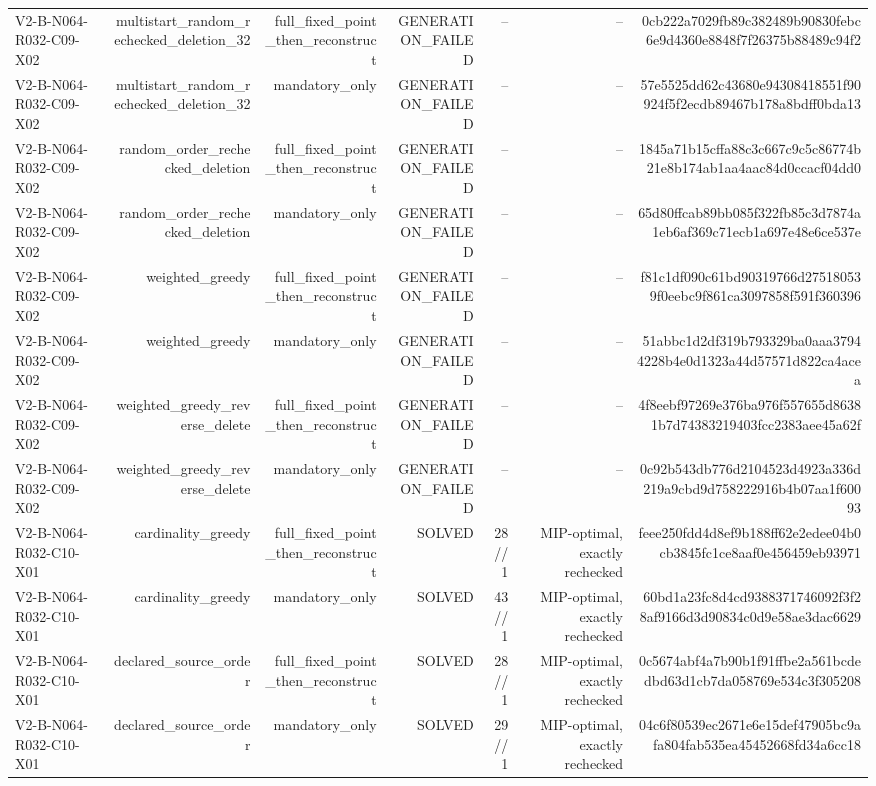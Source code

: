 {\begin{longtable}{lrrrrrr}
V2-B-N064-R032-C09-X02 & multistart\_random\_rechecked\_deletion\_32 & full\_fixed\_point\_then\_reconstruct & GENERATION\_FAILED & -- & -- & 0cb222a7029fb89c382489b90830febc6e9d4360e8848f7f26375b88489c94f2 \\
V2-B-N064-R032-C09-X02 & multistart\_random\_rechecked\_deletion\_32 & mandatory\_only & GENERATION\_FAILED & -- & -- & 57e5525dd62c43680e94308418551f90924f5f2ecdb89467b178a8bdff0bda13 \\
V2-B-N064-R032-C09-X02 & random\_order\_rechecked\_deletion & full\_fixed\_point\_then\_reconstruct & GENERATION\_FAILED & -- & -- & 1845a71b15cffa88c3c667c9c5c86774b21e8b174ab1aa4aac84d0ccacf04dd0 \\
V2-B-N064-R032-C09-X02 & random\_order\_rechecked\_deletion & mandatory\_only & GENERATION\_FAILED & -- & -- & 65d80ffcab89bb085f322fb85c3d7874a1eb6af369c71ecb1a697e48e6ce537e \\
V2-B-N064-R032-C09-X02 & weighted\_greedy & full\_fixed\_point\_then\_reconstruct & GENERATION\_FAILED & -- & -- & f81c1df090c61bd90319766d275180539f0eebc9f861ca3097858f591f360396 \\
V2-B-N064-R032-C09-X02 & weighted\_greedy & mandatory\_only & GENERATION\_FAILED & -- & -- & 51abbc1d2df319b793329ba0aaa37944228b4e0d1323a44d57571d822ca4acea \\
V2-B-N064-R032-C09-X02 & weighted\_greedy\_reverse\_delete & full\_fixed\_point\_then\_reconstruct & GENERATION\_FAILED & -- & -- & 4f8eebf97269e376ba976f557655d86381b7d74383219403fcc2383aee45a62f \\
V2-B-N064-R032-C09-X02 & weighted\_greedy\_reverse\_delete & mandatory\_only & GENERATION\_FAILED & -- & -- & 0c92b543db776d2104523d4923a336d219a9cbd9d758222916b4b07aa1f60093 \\
V2-B-N064-R032-C10-X01 & cardinality\_greedy & full\_fixed\_point\_then\_reconstruct & SOLVED & 28//1 & MIP-optimal, exactly rechecked & feee250fdd4d8ef9b188ff62e2edee04b0cb3845fc1ce8aaf0e456459eb93971 \\
V2-B-N064-R032-C10-X01 & cardinality\_greedy & mandatory\_only & SOLVED & 43//1 & MIP-optimal, exactly rechecked & 60bd1a23fc8d4cd9388371746092f3f28af9166d3d90834c0d9e58ae3dac6629 \\
V2-B-N064-R032-C10-X01 & declared\_source\_order & full\_fixed\_point\_then\_reconstruct & SOLVED & 28//1 & MIP-optimal, exactly rechecked & 0c5674abf4a7b90b1f91ffbe2a561bcdedbd63d1cb7da058769e534c3f305208 \\
V2-B-N064-R032-C10-X01 & declared\_source\_order & mandatory\_only & SOLVED & 29//1 & MIP-optimal, exactly rechecked & 04c6f80539ec2671e6e15def47905bc9afa804fab535ea45452668fd34a6cc18 \\

\end{longtable}}
